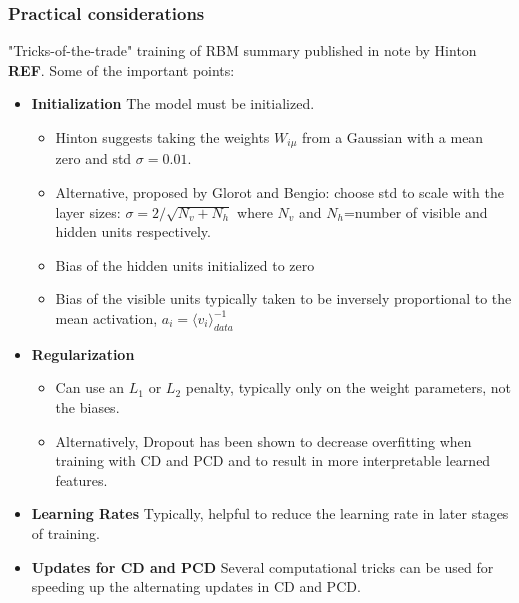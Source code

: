 \documentclass[norsk,a4paper,11pt]{article}
\begin{document}
\subsubsection{Practical considerations}
"Tricks-of-the-trade" training of RBM summary published in note by Hinton \textbf{REF}. Some of the important points:
\begin{itemize}
	\item \textbf{Initialization}
	The model must be initialized. 
	\begin{itemize}
		\item Hinton suggests taking the weights $W_{i\mu}$ from a Gaussian with a mean zero and std $\sigma=0.01$.
		\item Alternative, proposed by Glorot and Bengio: choose std to scale with the layer sizes: $\sigma = 2/\sqrt{N_v + N_h}$ where $N_v$ and $N_h$=number of visible and hidden units respectively.
		\item Bias of the hidden units initialized to zero
		\item Bias of the visible units typically taken to be inversely proportional to the mean activation, $a_i = \langle v_i \rangle_{data}^{-1}$
	\end{itemize} 
	\item \textbf{Regularization}
	\begin{itemize}
		\item Can use an $L_1$ or $L_2$ penalty, typically only on the weight parameters, not the biases.
		\item Alternatively, Dropout has been shown to decrease overfitting when training with CD and PCD and to result in more interpretable learned features.
	\end{itemize}
	\item \textbf{Learning Rates}
	Typically, helpful to reduce the learning rate in later stages of training.
	\item \textbf{Updates for CD and PCD}
	Several computational tricks can be used for speeding up the alternating updates in CD and PCD.
\end{itemize}
\end{document}
